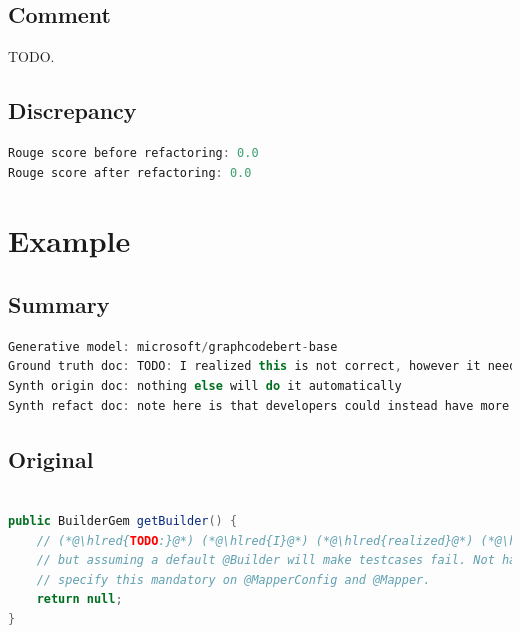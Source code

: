 \documentclass[usenames,dvipsnames]{article} %
\DeclareRobustCommand{\hlred}[1]{{\sethlcolor{pink}\hl{#1}}}
\begin{document}
  \subsection{Comment}

  TODO.

  \subsection{Discrepancy}

  \begin{lstlisting}[language=java]
Rouge score before refactoring: 0.0
Rouge score after refactoring: 0.0
  \end{lstlisting}



  \pagebreak
  \section{Example}
  \subsection{Summary}

  \begin{lstlisting}[language=java]
Generative model: microsoft/graphcodebert-base
Ground truth doc: TODO: I realized this is not correct, however it needs to be null in order to keep downward compatibility
Synth origin doc: nothing else will do it automatically
Synth refact doc: note here is that developers could instead have more information that should not need builder information and should also
  \end{lstlisting}

  \subsection{Original}
  \begin{lstlisting}[language=java]

public BuilderGem getBuilder() {
    // (*@\hlred{TODO:}@*) (*@\hlred{I}@*) (*@\hlred{realized}@*) (*@\hlred{this}@*) (*@\hlred{is not correct, however }@*)it (*@\hlred{needs to be null in order to keep downward compatibility}@*)
    // but assuming a default @Builder will make testcases fail. Not having a default means that you need to
    // specify this mandatory on @MapperConfig and @Mapper.
    return null;
}
  \end{lstlisting}
\end{document}
